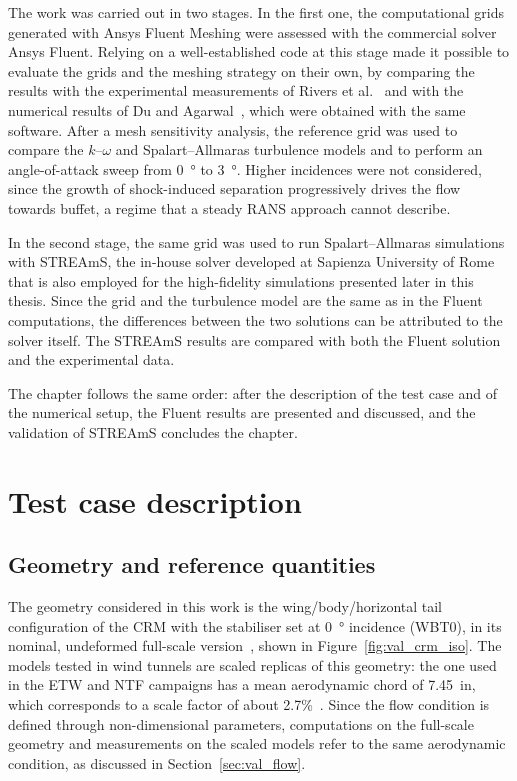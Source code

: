 The work was carried out in two stages. In the first one, the computational grids generated with Ansys Fluent Meshing were assessed with the commercial solver Ansys Fluent. Relying on a well-established code at this stage made it possible to evaluate the grids and the meshing strategy on their own, by comparing the results with the experimental measurements of Rivers et al.~\cite{rivers2015} and with the numerical results of Du and Agarwal~\cite{du2017}, which were obtained with the same software. After a mesh sensitivity analysis, the reference grid was used to compare the $k$--$\omega$ and Spalart--Allmaras turbulence models and to perform an angle-of-attack sweep from \SI{0}{\degree} to \SI{3}{\degree}. Higher incidences were not considered, since the growth of shock-induced separation progressively drives the flow towards buffet, a regime that a steady RANS approach cannot describe.

In the second stage, the same grid was used to run Spalart--Allmaras simulations with STREAmS, the in-house solver developed at Sapienza University of Rome that is also employed for the high-fidelity simulations presented later in this thesis. Since the grid and the turbulence model are the same as in the Fluent computations, the differences between the two solutions can be attributed to the solver itself. The STREAmS results are compared with both the Fluent solution and the experimental data.

The chapter follows the same order: after the description of the test case and of the numerical setup, the Fluent results are presented and discussed, and the validation of STREAmS concludes the chapter.

\section{Test case description}
\label{sec:val_testcase}

\subsection{Geometry and reference quantities}
\label{sec:val_geometry}

The geometry considered in this work is the wing/body/horizontal tail configuration of the CRM with the stabiliser set at \SI{0}{\degree} incidence (WBT0), in its nominal, undeformed full-scale version~\cite{vassberg2008}, shown in Figure~\ref{fig:val_crm_iso}. The models tested in wind tunnels are scaled replicas of this geometry: the one used in the ETW and NTF campaigns has a mean aerodynamic chord of \SI{7.45}{in}, which corresponds to a scale factor of about 2.7\%~\cite{rivers2015}. Since the flow condition is defined through non-dimensional parameters, computations on the full-scale geometry and measurements on the scaled models refer to the same aerodynamic condition, as discussed in Section~\ref{sec:val_flow}.

